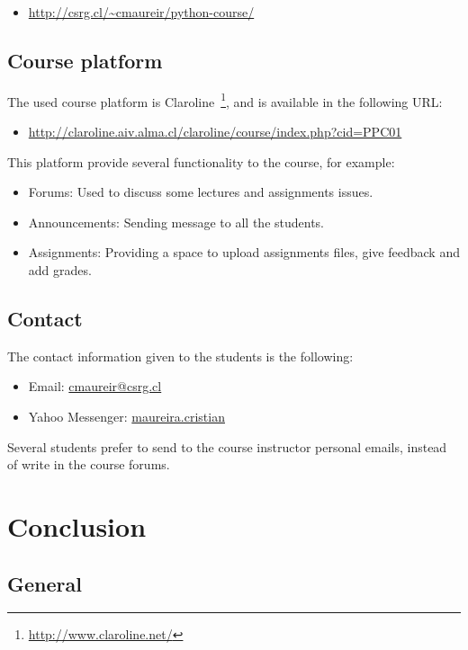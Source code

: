 \documentclass[letter, 10pt]{article}
\begin{document}
\begin{itemize}
    \item \url{http://csrg.cl/~cmaureir/python-course/}
\end{itemize}

\subsection{Course platform}

The used course platform is Claroline~\footnote{\url{http://www.claroline.net/}},
and is available in the following URL:

\begin{itemize}
    \item \url{http://claroline.aiv.alma.cl/claroline/course/index.php?cid=PPC01}
\end{itemize}

This platform provide several functionality to the course,
for example:
\begin{itemize}
    \item Forums: Used to discuss some lectures and assignments issues.
    \item Announcements: Sending message to all the students.
    \item Assignments: Providing a space to upload assignments files, give feedback and add grades.
\end{itemize}

\subsection{Contact}

The contact information given to the students
is the following:

\begin{itemize}
    \item Email: \url{cmaureir@csrg.cl}
    \item Yahoo Messenger: \url{maureira.cristian}
\end{itemize}

Several students prefer to send to the course instructor personal emails,
instead of write in the course forums.

\section{Conclusion}

\subsection{General}
\end{document}
